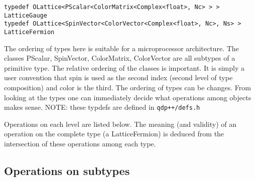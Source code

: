 \documentclass[12pt,letterpaper]{article}
\begin{document}
\begin{verbatim}
typedef OLattice<PScalar<ColorMatrix<Complex<float>, Nc> > > LatticeGauge
typedef OLattice<SpinVector<ColorVector<Complex<float>, Nc>, Ns> > LatticeFermion
\end{verbatim}
%
The ordering of types here is suitable for a microprocessor
architecture.  The classes PScalar, SpinVector, ColorMatrix,
ColorVector are all subtypes of a primitive type. The relative
ordering of the classes is important. It is simply a user convention
that spin is used as the second index (second level of type
composition) and color is the third. The ordering of types can be
changes. From looking at the types one can immediately decide what
operations among objects makes sense.
NOTE: these typdefs are defined in  {\tt qdp++/defs.h}

Operations on each level are listed below. The meaning (and validity)
of an operation on the complete type (a LatticeFermion) is deduced
from the intersection of these operations among each type.

\subsection{Operations on subtypes}
\end{document}
